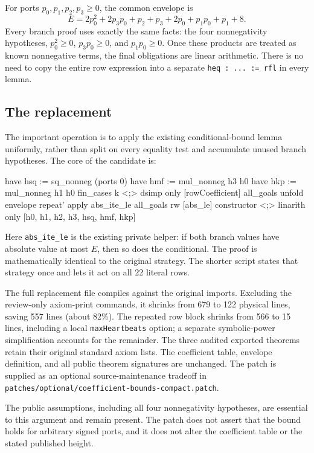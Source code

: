 \documentclass[11pt,letterpaper]{article}
\newcommand{\artifact}[1]{\nolinkurl{#1}}
\begin{document}
For ports $p_0,p_1,p_2,p_3\geq0$, the common envelope is
\[
 E=2p_0^2+2p_3p_0+p_2+p_3+2p_0+p_1p_0+p_1+8.
\]
Every branch proof uses exactly the same facts: the four nonnegativity
hypotheses, $p_0^2\geq0$, $p_3p_0\geq0$, and $p_1p_0\geq0$. Once these
products are treated as known nonnegative terms, the final obligations are
linear arithmetic. There is no need to copy the entire row expression into
a separate \texttt{heq : ... := rfl} in every lemma.

\subsection{The replacement}

The important operation is to apply the existing conditional-bound lemma
uniformly, rather than split on every equality test and accumulate unused
branch hypotheses. The core of the candidate is:

\begin{LeanCode}
have hsq := sq_nonneg (ports 0)
have hmf := mul_nonneg h3 h0
have hkp := mul_nonneg h1 h0
fin_cases k <;> dsimp only [rowCoefficient]
all_goals
  unfold envelope
  repeat' apply abs_ite_le
  all_goals
    rw [abs_le]
    constructor <;> linarith only [h0, h1, h2, h3, hsq, hmf, hkp]
\end{LeanCode}

Here \texttt{abs\_ite\_le} is the existing private helper: if both branch
values have absolute value at most $E$, then so does the conditional. The
proof is mathematically identical to the original strategy. The shorter
script states that strategy once and lets it act on all 22 literal rows.

The full replacement file compiles against the original imports. Excluding the review-only axiom-print commands, it shrinks from 679 to 122 physical lines, saving 557 lines (about 82\%). The repeated row block shrinks from 566 to 15 lines, including a local \texttt{maxHeartbeats} option; a separate symbolic-power simplification accounts for the remainder. The three audited exported theorems retain their original standard axiom lists. The coefficient table, envelope definition, and all public theorem signatures are unchanged. The patch is supplied as an optional source-maintenance tradeoff in \artifact{patches/optional/coefficient-bounds-compact.patch}.

The public assumptions, including all four nonnegativity hypotheses, are
essential to this argument and remain present. The patch does not assert
that the bound holds for arbitrary signed ports, and it does not alter the
coefficient table or the stated published height.
\end{document}
